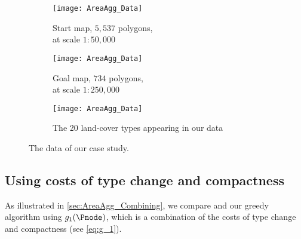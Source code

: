 \begin{figure}[tb]
	\captionsetup[subfigure]{labelformat=empty}
	\begin{subfigure}[b]{.49\textwidth}
		\centering
		\texttt{[image: AreaAgg\_Data]}
		\caption{Start map, $5{,}537$ polygons, \\
			at scale $1:50{,}000$}
	\end{subfigure}
	\hfill
	\begin{subfigure}[b]{.49\textwidth}
		\centering
		\texttt{[image: AreaAgg\_Data]}
		\caption{Goal map, $734$ polygons, \\
			at scale $1:250{,}000$}
	\end{subfigure}
	
	\bigskip
	
	\begin{subfigure}{\textwidth}
		\centering
		\texttt{[image: AreaAgg\_Data]}
		\caption{The 20 land-cover types appearing in our data}
	\end{subfigure}
	\caption{The data of our case study.}
	\label{fig:AreaAgg_Data}
\end{figure}

\subsection{Using costs of type change and compactness}
As illustrated in \sect\ref{sec:AreaAgg_Combining},
we compare \Astar and our greedy algorithm using $g_1(\Pnode)$,
which is a combination of the costs 
of type change and compactness (see \eq\ref{eq:g_1}).

